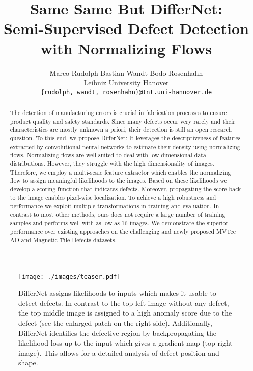 \documentclass[10pt,twocolumn,letterpaper]{article}
\begin{document}
\title{Same Same But DifferNet: \\Semi-Supervised Defect Detection with Normalizing Flows}

\author{Marco Rudolph \hspace{2cm} Bastian Wandt \hspace{2cm} Bodo Rosenhahn
\\Leibniz University Hanover\\
{\tt\small \{rudolph, wandt, rosenhahn\}@tnt.uni-hannover.de}}

\maketitle


\begin{abstract}
    The detection of manufacturing errors is crucial in fabrication processes to ensure product quality and safety standards.
    Since many defects occur very rarely and their characteristics are mostly unknown a priori, their detection is still an open research question.
To this end, we propose \textnormal{DifferNet}: It leverages the descriptiveness of features extracted by convolutional neural networks to estimate their density using normalizing flows.
Normalizing flows are well-suited to deal with low dimensional data distributions.
    However, they struggle with the high dimensionality of images.
Therefore, we employ a multi-scale feature extractor which enables the normalizing flow to assign meaningful likelihoods to the images.
Based on these likelihoods we develop a scoring function that indicates defects.
    Moreover, propagating the score back to the image enables pixel-wise localization.
    To achieve a high robustness and performance we exploit multiple transformations in training and evaluation.
In contrast to most other methods, ours does not require a large number of training samples and performs well with as low as 16 images.
    We demonstrate the superior performance over existing approaches on the challenging and newly proposed MVTec AD \cite{mvtec} and Magnetic Tile Defects \cite{magnets} datasets.
   
   
\end{abstract}

\begin{figure}
\centering
  \texttt{[image: ./images/teaser.pdf]} 
 \caption{DifferNet assigns likelihoods to inputs which makes it usable to detect defects. In contrast to the top left image without any defect, the top middle image is assigned to a high anomaly score due to the defect (see the enlarged patch on the right side). Additionally, DifferNet identifies the defective region by backpropagating the likelihood loss up to the input which gives a gradient map (top right image). This allows for a detailed analysis of defect position and shape.}
\label{fig:teaser}
\end{figure}
\end{document}
